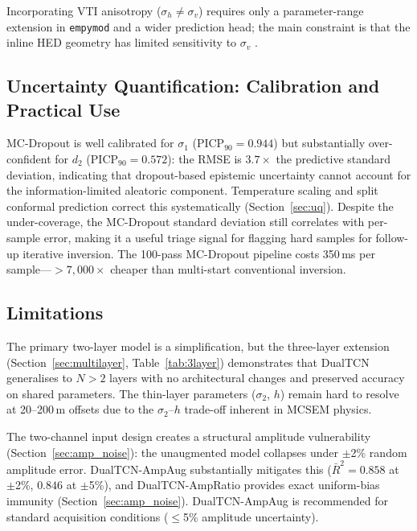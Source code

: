 \documentclass[journal]{IEEEtran}
\begin{document}
Incorporating VTI anisotropy ($\sigma_h \neq \sigma_v$) requires
only a parameter-range extension in \texttt{empymod} and a wider
prediction head; the main constraint is that the inline HED geometry
has limited sensitivity to $\sigma_v$ \citep{key2009}.

\subsection{Uncertainty Quantification: Calibration and Practical
Use}
\label{sec:uq_discussion}

MC-Dropout is well calibrated for $\sigma_1$
(PICP$_{90} = 0.944$) but substantially over-confident for $d_2$
(PICP$_{90} = 0.572$): the RMSE is $3.7\times$ the predictive
standard deviation, indicating that dropout-based epistemic
uncertainty cannot account for the information-limited aleatoric
component.  Temperature scaling and split conformal prediction
correct this systematically (Section~\ref{sec:uq}).  Despite the
under-coverage, the MC-Dropout standard deviation still correlates
with per-sample error, making it a useful triage signal for flagging
hard samples for follow-up iterative inversion.  The 100-pass
MC-Dropout pipeline costs 350\,ms per sample---$> 7{,}000\times$
cheaper than multi-start conventional inversion.

\subsection{Limitations}
\label{sec:limitations}

The primary two-layer model is a simplification, but the three-layer
extension (Section~\ref{sec:multilayer}, Table~\ref{tab:3layer})
demonstrates that DualTCN generalises to $N > 2$ layers with no
architectural changes and preserved accuracy on shared parameters.
The thin-layer parameters ($\sigma_2$, $h$) remain hard to resolve
at 20--200\,m offsets due to the $\sigma_2$--$h$ trade-off inherent
in MCSEM physics.

The two-channel input design creates a structural amplitude
vulnerability (Section~\ref{sec:amp_noise}): the unaugmented model
collapses under $\pm$2\% random amplitude error.  DualTCN-AmpAug
substantially mitigates this ($\bar{R}^2 = 0.858$ at $\pm$2\%,
$0.846$ at $\pm$5\%), and DualTCN-AmpRatio provides exact
uniform-bias immunity (Section~\ref{sec:amp_noise}).
DualTCN-AmpAug is recommended for standard acquisition conditions
($\leq$5\% amplitude uncertainty).
\end{document}
